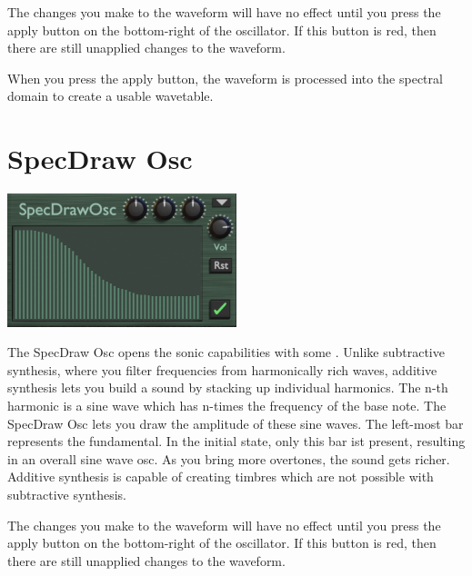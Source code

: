 \begin{tcolorbox}[colback=yellow!10!white,
        colframe=white!20!black,
        center,
        valign=top,
        halign=left,
        center title,
        width=\textwidth]

    The changes you make to the waveform will have no effect until you press the apply button on the bottom-right of the oscillator. If this button is red, then there are still unapplied changes to the waveform.
\end{tcolorbox}

When you press the apply button, the waveform is processed into the spectral domain to create a usable wavetable.

\section{SpecDraw Osc}
\begin{center}
    \includegraphics[width=0.5\textwidth]{graphics/specdraw_osc.png}
\end{center}
The SpecDraw Osc opens the sonic capabilities with some . Unlike subtractive synthesis, where you filter frequencies from harmonically rich waves, additive synthesis lets you build a sound by stacking up individual harmonics. The n-th harmonic is a sine wave which has n-times the frequency of the base note. The SpecDraw Osc lets you draw the amplitude of these sine waves. The left-most bar represents the fundamental. In the initial state, only this bar ist present, resulting in an overall sine wave osc. As you bring more overtones, the sound gets richer. Additive synthesis is capable of creating timbres which are not possible with subtractive synthesis.

\begin{tcolorbox}[colback=yellow!10!white,
        colframe=white!20!black,
        center,
        valign=top,
        halign=left,
        center title,
        width=\textwidth]

    The changes you make to the waveform will have no effect until you press the apply button on the bottom-right of the oscillator. If this button is red, then there are still unapplied changes to the waveform.
\end{tcolorbox}
